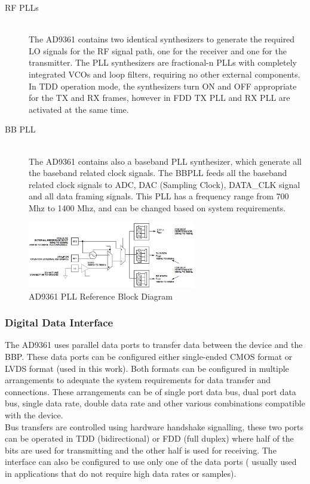 \begin{description}
	\item[RF PLLs] \hfill \\
	The AD9361 contains two identical synthesizers to generate the required LO
signals for the RF signal path, one for the receiver and one for the
transmitter. The PLL synthesizers are fractional-n PLLs with completely
integrated VCOs and loop filters, requiring no other external components. In TDD
operation mode, the synthesizers turn ON and OFF appropriate for the TX and RX
frames, however in FDD TX PLL and RX PLL are activated at the same time.

	\item[BB PLL] \hfill \\
  The AD9361 contains also a baseband PLL synthesizer,
	which generate all the baseband related clock signals. The BBPLL feeds all the
	baseband related clock signals to ADC, DAC (Sampling Clock), DATA\_CLK signal
	and all data framing signals. This PLL has a frequency range from 700 Mhz to
	1400 Mhz, and can be changed based on system requirements.

\end{description}

\begin{figure}[htbp]
    \centering
    \includegraphics[width=0.65\textwidth]{./figures/pll_ref_block}
    \caption{ AD9361 PLL Reference Block Diagram
    \label{fig:pll}}
\end{figure}

\subsubsection{Digital Data Interface}

The AD9361 uses parallel data ports to transfer data between the device and the
BBP. These data ports can be configured either single-ended CMOS format or LVDS
format (used in this work). Both formats can be configured in multiple
arrangements to adequate the system requirements for data transfer and
connections. These arrangements can be of single port data bus, dual port data
bus, single data rate, double data rate and other various combinations
compatible with the device.\\ Bus transfers are controlled using hardware
handshake signalling, these two ports can be operated in TDD (bidirectional) or
FDD (full duplex) where half of the bits are used for transmitting and the other
half is used for receiving. The interface can also be configured to use only one
of the data ports ( usually used in applications that do not require high data
rates or samples).\\

